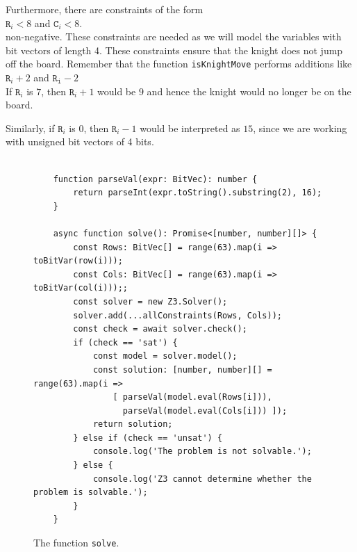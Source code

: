 \begin{enumerate}
      Furthermore, there are constraints of the form
      \\[0.2cm]
      \hspace*{1.3cm}
      $\mathtt{R}_i < 8$ \quad and \quad $\mathtt{C}_i < 8$.
      \\[0.2cm]
      non-negative.  These constraints are needed as we will model the variables with bit vectors of length 4.
      These constraints ensure that the knight does not jump off the board.  Remember that the function
      \texttt{isKnightMove} performs additions like
      \\[0.2cm]
      \hspace*{1.3cm}
      $\mathtt{R}_i + 2$ \quad and \quad $\mathtt{R_i} - 2$
      \\[0.2cm]
      If $\mathtt{R}_i$ is $7$, then $\mathtt{R}_i + 1$ would be $9$ and hence the knight would no longer be on
      the board.

      Similarly, if $\mathtt{R}_i$ is $0$, then $\mathtt{R}_i - 1$ would be interpreted as $15$,
      since we are working with unsigned bit vectors of 4 bits.
\end{enumerate}

\begin{figure}[!ht]
\centering
\begin{verbatim}

    function parseVal(expr: BitVec): number {
        return parseInt(expr.toString().substring(2), 16);
    }
    
    async function solve(): Promise<[number, number][]> {
        const Rows: BitVec[] = range(63).map(i => toBitVar(row(i)));
        const Cols: BitVec[] = range(63).map(i => toBitVar(col(i)));;
        const solver = new Z3.Solver();
        solver.add(...allConstraints(Rows, Cols));
        const check = await solver.check();      
        if (check == 'sat') {
            const model = solver.model();
            const solution: [number, number][] = range(63).map(i => 
                [ parseVal(model.eval(Rows[i])),
                  parseVal(model.eval(Cols[i])) ]);
            return solution;
        } else if (check == 'unsat') {
            console.log('The problem is not solvable.');
        } else {
            console.log('Z3 cannot determine whether the problem is solvable.');
        }
    }\end{verbatim}
\vspace*{-0.3cm}
\caption{The function \texttt{solve}.}
\label{fig:Knight's Tour with Z3.ipynb-2}
\end{figure}

